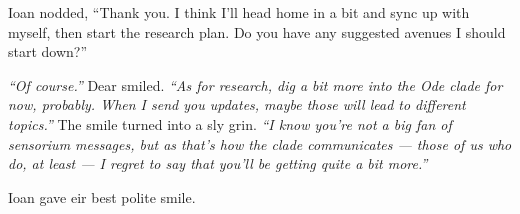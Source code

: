 Ioan nodded, ``Thank you. I think I'll head home in a bit and sync up with myself, then start the research plan. Do you have any suggested avenues I should start down?''

\emph{``Of course.''} Dear smiled. \emph{``As for research, dig a bit more into the Ode clade for now, probably. When I send you updates, maybe those will lead to different topics.''} The smile turned into a sly grin. \emph{``I know you're not a big fan of sensorium messages, but as that's how the clade communicates — those of us who do, at least — I regret to say that you'll be getting quite a bit more.''}

Ioan gave eir best polite smile.
